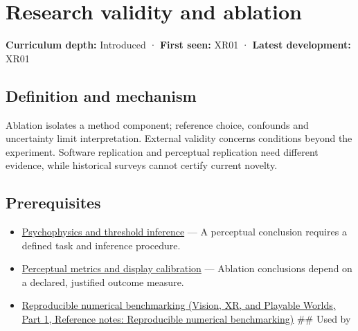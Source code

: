 \hypertarget{appendix-65788587ef78}{}\label{referencestart:appendix-65788587ef78}
\section{Research validity and ablation}\label{appendix-65788587ef78-research-validity-and-ablation}

\hypertarget{appendix-65788587ef78-research-validity-and-ablation}{}

\textbf{Curriculum depth:} Introduced · \textbf{First seen:} XR01 · \textbf{Latest development:} XR01

\begin{allmightroledefinition}

\subsection{Definition and mechanism}\label{appendix-65788587ef78-definition-and-mechanism}

\hypertarget{appendix-65788587ef78-definition-and-mechanism}{}

Ablation isolates a method component; reference choice, confounds and uncertainty limit interpretation. External validity concerns conditions beyond the experiment. Software replication and perceptual replication need different evidence, while historical surveys cannot certify current novelty.

\end{allmightroledefinition}

\subsection{Prerequisites}\label{appendix-65788587ef78-prerequisites}

\hypertarget{appendix-65788587ef78-prerequisites}{}

\begin{itemize}
\item
  \hyperref[appendix-1759f03e8ce7]{Psychophysics and threshold inference} --- A perceptual conclusion requires a defined task and inference procedure.
\item
  \hyperref[appendix-b2c1846508bf]{Perceptual metrics and display calibration} --- Ablation conclusions depend on a declared, justified outcome measure.
\item
  \href{../07-Vision-XR-and-Playable-Worlds-P01/main.pdf\#nameddest=appendix-b9db93e28371}{Reproducible numerical benchmarking (Vision, XR, and Playable Worlds, Part 1, Reference notes: Reproducible numerical benchmarking)} \#\# Used by
\end{itemize}

